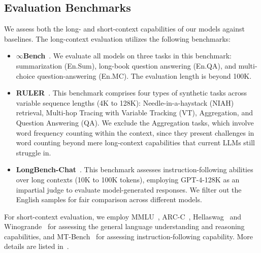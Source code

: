 \subsection{Evaluation Benchmarks}
We assess both the long- and short-context capabilities of our models against baselines. The long-context evaluation utilizes the following benchmarks:
\begin{itemize}
    \item \textbf{$\infty$Bench}~\citep{zhang-etal-2024-bench}. We evaluate all models on three tasks in this benchmark: summarization (En.Sum), long-book question answering (En.QA), and multi-choice question-answering (En.MC). The evaluation length is beyond 100K.
    \item \textbf{RULER}~\citep{hsieh2024ruler}. This benchmark comprises four types of synthetic tasks across variable sequence lengths (4K to 128K): Needle-in-a-haystack (NIAH) retrieval, Multi-hop Tracing with Variable Tracking (VT), Aggregation, and Question Answering (QA). 
    We exclude the Aggregation tasks, which involve word frequency counting within the context, since they present challenges in word counting beyond mere long-context capabilities that current LLMs still struggle in.    
    \item \textbf{LongBench-Chat}~\citep{bai2024longalign}. This benchmark assesses instruction-following abilities over long contexts (10K to 100K tokens), employing GPT-4-128K as an impartial judge to evaluate model-generated responses. We filter out the English samples for fair comparison across different models.
\end{itemize}
For short-context evaluation, we employ MMLU~\citep{hendrycks2021measuring}, ARC-C~\citep{Clark2018ThinkYH}, Hellaswag~\citep{Zellers2019HellaSwagCA} and Winogrande~\citep{sakaguchi2019winogrande} for assessing the general language understanding and reasoning capabilities, and MT-Bench~\citep{Zheng2023JudgingLW} for assessing instruction-following capability. More details are listed in~.




